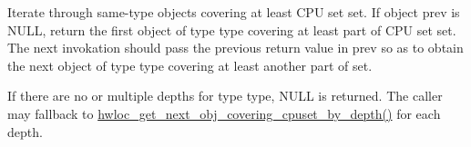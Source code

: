 Iterate through same-\/type objects covering at least CPU set {\ttfamily set}. If object {\ttfamily prev} is {\ttfamily NULL}, return the first object of type {\ttfamily type} covering at least part of CPU set {\ttfamily set}. The next invokation should pass the previous return value in {\ttfamily prev} so as to obtain the next object of type {\ttfamily type} covering at least another part of {\ttfamily set}.

If there are no or multiple depths for type {\ttfamily type}, {\ttfamily NULL} is returned. The caller may fallback to \hyperlink{group__hwlocality__helper__find__coverings_ga39cbd3f1608d0fe503d396430cffe219}{hwloc\_\-get\_\-next\_\-obj\_\-covering\_\-cpuset\_\-by\_\-depth()} for each depth. 
